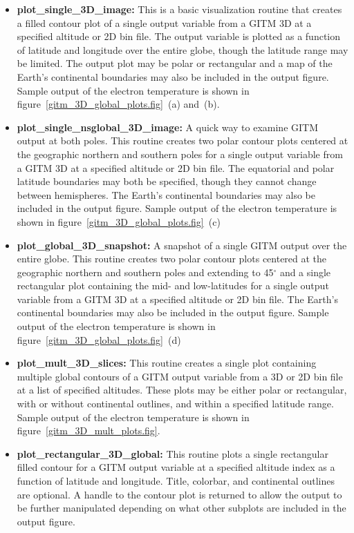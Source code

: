 \begin{itemize}
\item[]{{\bf plot\_single\_3D\_image:}  This is a basic visualization routine that creates a filled contour plot of a single output variable from a GITM 3D at a specified altitude or 2D bin file.  The output variable is plotted as a function of latitude and longitude over the entire globe, though the latitude range may be limited.  The output plot may be polar or rectangular and a map of the Earth's continental boundaries may also be included in the output figure.  Sample output of the electron temperature is shown in figure~\ref{gitm_3D_global_plots.fig}~(a) and~(b).}
\item[]{{\bf plot\_single\_nsglobal\_3D\_image:}  A quick way to examine GITM output at both poles.  This routine creates two polar contour plots centered at the geographic northern and southern poles for a single output variable from a GITM 3D at a specified altitude or 2D bin file.  The equatorial and polar latitude boundaries may both be specified, though they cannot change between hemispheres.  The Earth's continental boundaries may also be included in the output figure.  Sample output of the electron temperature is shown in figure~\ref{gitm_3D_global_plots.fig}~(c)}
\item[]{{\bf plot\_global\_3D\_snapshot:}  A snapshot of a single GITM output over the entire globe.  This routine creates two polar contour plots centered at the geographic northern and southern poles and extending to 45$^\circ$ and a single rectangular plot containing the mid- and low-latitudes for a single output variable from a GITM 3D at a specified altitude or 2D bin file.  The Earth's continental boundaries may also be included in the output figure.  Sample output of the electron temperature is shown in figure~\ref{gitm_3D_global_plots.fig}~(d)}
\item[]{{\bf plot\_mult\_3D\_slices:}  This routine creates a single plot containing multiple global contours of a GITM output variable from a 3D or 2D bin file at a list of specified altitudes.  These plots may be either polar or rectangular, with or without continental outlines, and within a specified latitude range.  Sample output of the electron temperature is shown in figure~\ref{gitm_3D_mult_plots.fig}.}
\item[]{{\bf plot\_rectangular\_3D\_global:} This routine plots a single rectangular filled contour for a GITM output variable at a specified altitude index as a function of latitude and longitude.  Title, colorbar, and continental outlines are optional.  A handle to the contour plot is returned to allow the output to be further manipulated depending on what other subplots are included in the output figure.} 

\end{itemize}
